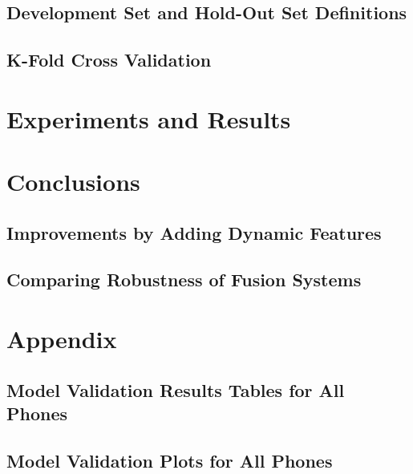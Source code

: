 \documentclass[11pt,a4paper]{tesis}
\begin{document}
	\section{Development Set and Hold-Out Set Definitions}
		
	\section{K-Fold Cross Validation}
		

\chapter{Experiments and Results}
	

\chapter{Conclusions}
	\section{Improvements by Adding Dynamic Features}
	\section{Comparing Robustness of Fusion Systems}

\chapter{Appendix}
	\begin{appendices}
		
		\section{Model Validation Results Tables for All Phones} \label{section:tables}
			
		\section{Model Validation Plots for All Phones} \label{section:plots}
			
	\end{appendices}

\printbibliography
\end{document}
